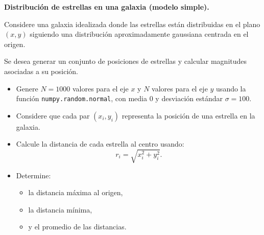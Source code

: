 \item \textbf{Distribución de estrellas en una galaxia (modelo simple).}

\begin{tcolorbox}[colback=blue!2!white,colframe=blue!55!black,title={Enunciado}]

Considere una galaxia idealizada donde las estrellas están distribuidas en el plano \((x,y)\) siguiendo una distribución aproximadamente gaussiana centrada en el origen.

Se desea generar un conjunto de posiciones de estrellas y calcular magnitudes asociadas a su posición.

\begin{itemize}
\item[(a)] Genere \(N = 1000\) valores para el eje \(x\) y \(N\) valores para el eje \(y\) usando la función \texttt{numpy.random.normal}, con media \(0\) y desviación estándar \(\sigma = 100 \).

\item[(b)] Considere que cada par \((x_i, y_i)\) representa la posición de una estrella en la galaxia.

\item[(c)] Calcule la distancia de cada estrella al centro usando:
\[
r_i = \sqrt{x_i^2 + y_i^2}.
\]

\item[(d)] Determine:
\begin{itemize}
\item la distancia máxima al origen,
\item la distancia mínima,
\item y el promedio de las distancias.
\end{itemize}

\end{itemize}

\end{tcolorbox}

